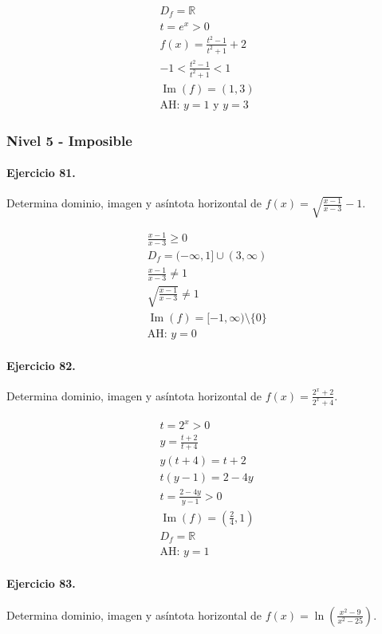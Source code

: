 \documentclass[11pt,a4paper]{article}
\begin{document}
\[
\begin{aligned}
D_f=\mathbb{R}\\
t=e^x>0\\
f(x)=\frac{t^2-1}{t^2+1}+2\\
-1<\frac{t^2-1}{t^2+1}<1\\
\operatorname{Im}(f)=(1,3)\\
\text{AH: }y=1\text{ y }y=3
\end{aligned}
\]


\newpage

\subsubsection*{Nivel 5 - Imposible}

\paragraph{Ejercicio 81.} Determina dominio, imagen y asíntota horizontal de $f(x)=\sqrt{\frac{x-1}{x-3}}-1$.

\[
\begin{aligned}
\frac{x-1}{x-3}\ge0\\
D_f=(-\infty,1]\cup(3,\infty)\\
\frac{x-1}{x-3}\ne1\\
\sqrt{\frac{x-1}{x-3}}\ne1\\
\operatorname{Im}(f)=[-1,\infty)\setminus\{0\}\\
\text{AH: }y=0
\end{aligned}
\]


\paragraph{Ejercicio 82.} Determina dominio, imagen y asíntota horizontal de $f(x)=\frac{2^x+2}{2^x+4}$. 

\[
\begin{aligned}
t=2^x>0\\
y=\frac{t+2}{t+4}\\
y(t+4)=t+2\\
t(y-1)=2-4y\\
t=\frac{2-4y}{y-1}>0\\
\operatorname{Im}(f)=(\frac{2}{4},1)\\
D_f=\mathbb{R}\\
\text{{AH: }}y=1
\end{aligned}
\]


\paragraph{Ejercicio 83.} Determina dominio, imagen y asíntota horizontal de $f(x)=\ln\left(\frac{x^2-9}{x^2-25}\right)$.
\end{document}
